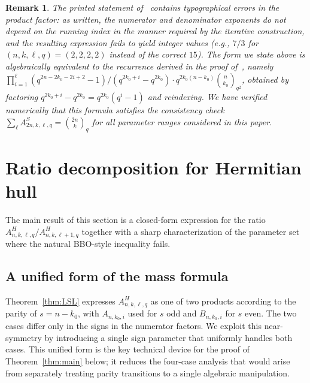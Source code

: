 \documentclass[10pt,a4paper]{amsart}
\newtheorem{remark}[theorem]{Remark}
\begin{document}
\begin{remark}
The printed statement of~\cite[Theorem 4.9]{LSL2024} contains typographical
errors in the product factor: as written, the numerator and denominator exponents
do not depend on the running index in the manner required by the iterative
construction, and the resulting expression fails to yield integer values
(e.g., $7/3$ for $(n,k,\ell,q) = (2,2,2,2)$ instead of the correct $15$).
The form we state above is algebraically equivalent to the recurrence derived in
the proof of~\cite[Theorem 4.9]{LSL2024}, namely
$\prod_{i=1}^{\ell} (q^{2n-2k_0-2i+2}-1)/(q^{2k_0+i}-q^{2k_0}) \cdot
q^{2k_0(n-k_0)} \binom{n}{k_0}_{q^2}$,
obtained by factoring $q^{2k_0+i}-q^{2k_0} = q^{2k_0}(q^i-1)$ and reindexing.
We have verified numerically that this formula satisfies the consistency check
$\sum_\ell A^S_{2n,k,\ell,q} = \binom{2n}{k}_q$ for all parameter ranges
considered in this paper.
\end{remark}

\section{Ratio decomposition for Hermitian hull}\label{sec:main}

The main result of this section is a closed-form expression for the ratio
$A^H_{n,k,\ell,q} / A^H_{n,k,\ell+1,q}$ together with a sharp characterization
of the parameter set where the natural BBO-style inequality fails.

\subsection{A unified form of the mass formula}\label{sec:unified}

Theorem~\ref{thm:LSL} expresses $A^H_{n,k,\ell,q}$ as one of two products
according to the parity of $s = n - k_0$, with $A_{n,k_0,i}$ used for $s$ odd
and $B_{n,k_0,i}$ for $s$ even. The two cases differ only in the signs in the
numerator factors. We exploit this near-symmetry by introducing a single
sign parameter that uniformly handles both cases. This unified form is the
key technical device for the proof of Theorem~\ref{thm:main} below; it
reduces the four-case analysis that would arise from separately treating
parity transitions to a single algebraic manipulation.
\end{document}
